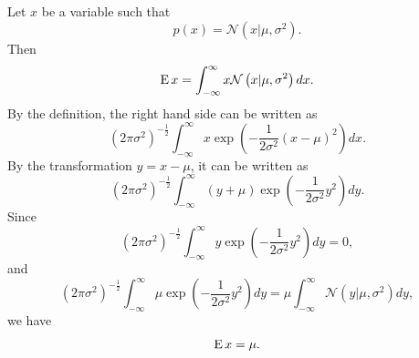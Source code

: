 \subsection{}
\label{1.8}
Let $x$ be a variable such that
%
\begin{equation}
p(x) 
= 
\mathcal{N} (x | \mu, \sigma ^ 2).
\end{equation}
%
Then
%
\begin{equation}
\operatorname{E} x 
= 
\int_{-\infty}^{\infty} 
x 
\mathcal{N} \left( x | \mu, \sigma ^ 2 \right) 
dx.
\end{equation}
%
By the definition, the right hand side can be written as
%
\begin{equation}
\left( 
	2 \pi \sigma ^ 2 
\right) ^ {-\frac{1}{2}} 
\int_{-\infty}^{\infty} 
x 
\exp 
\left( 
	-
	\frac{1}{2 \sigma ^ 2} 
	(x - \mu) ^ 2 
\right) 
dx.
\end{equation}
%
By the transformation $y = x - \mu$, it can be written as 
%
\begin{equation}
\left( 
	2 \pi \sigma ^ 2 
\right) ^ {-\frac{1}{2}} 
\int_{-\infty}^{\infty} 
(y + \mu) 
\exp 
\left( 
	-
	\frac{1}{2 \sigma ^ 2}
	y ^ 2 
\right) 
dy.
\end{equation}
%
Since 
%
\begin{equation}
\left( 
	2 \pi \sigma ^ 2 
\right) ^ {-\frac{1}{2}} 
\int_{-\infty}^{\infty} 
y 
\exp 
\left( 
	-
	\frac{1}{2 \sigma ^ 2}
	y ^ 2 
\right) 
dy 
= 
0,
\end{equation}
%
and
%
\begin{equation}
\left( 
	2 \pi \sigma ^ 2 
\right) ^ {-\frac{1}{2}} 
\int_{-\infty}^{\infty} 
	\mu 
	\exp 
	\left( 
		-
		\frac{1}{2 \sigma ^ 2}
		y ^ 2 
	\right) 
dy 
= 
\mu 
\int_{- \infty}^{\infty} 
\mathcal{N} 
\left( 
	y 
	| 
	\mu, 
	\sigma ^ 2 
\right) 
dy,
\end{equation}
%
we have
%
\begin{equation}
\operatorname{E} x 
= 
\mu.
\end{equation}
%

